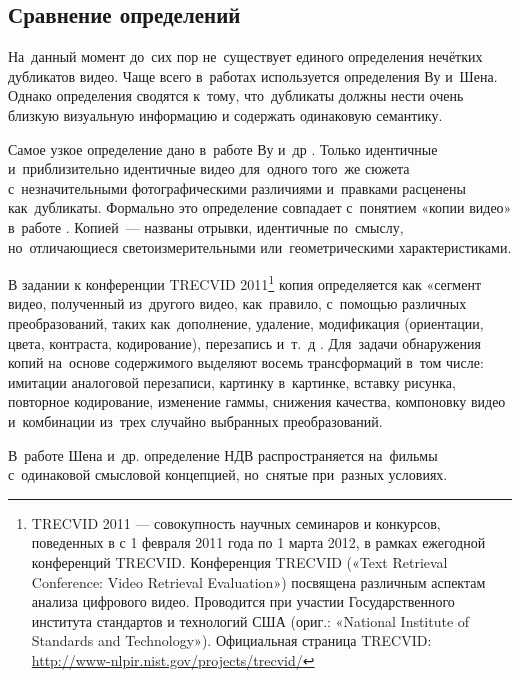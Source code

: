 \documentclass{.local/lib/classes/ndvr-super-article-standalone}
\begin{document}
    \pagebreak

    \subsection{Сравнение определений}

    На~данный момент до~сих пор не~существует единого
    определения нечётких дубликатов видео.
    Чаще всего в~работах используется определения Ву и~Шена.
    Однако определения сводятся к~тому, что~дубликаты 
    должны нести очень близкую визуальную информацию
    и содержать одинаковую семантику.

    Самое узкое определение дано в~работе Ву и~др \cite{Wu:2007a}.
    Только идентичные и~приблизительно идентичные видео
    для~одного того~же сюжета с~незначительными фотографическими различиями
    и~правками расценены как~дубликаты.
    Формально это определение совпадает
    с~понятием «копии видео» в~работе \cite{Law-To:2007}.
    Копией~— названы отрывки, идентичные по~смыслу,
    но~отличающиеся светоизмерительными 
    или~геометрическими характеристиками.

    В задании к конференции TRECVID 2011\footnote{
        TRECVID 2011 — совокупность научных семинаров и конкурсов,
        поведенных в с 1 февраля 2011 года по 1 марта 2012,
        в рамках ежегодной конференций TRECVID.
        Конференция TRECVID 
        («Text Retrieval Conference: 
        Video Retrieval Evaluation») 
        посвящена различным аспектам анализа цифрового видео.
        Проводится при участии Государственного института 
        стандартов и технологий США 
        (ориг.: «National Institute of Standards and Technology»).
        Официальная страница TRECVID:
            \href{http://www-nlpir.nist.gov/projects/trecvid/}%
                {http://www-nlpir.nist.gov/projects/trecvid/}
    } копия определяется как
    «сегмент видео, полученный из~другого видео,
    как~правило, с~помощью различных преобразований,
    таких как~дополнение, удаление, модификация
    (ориентации, цвета, контраста, кодирование),
    перезапись и~т.~д \cite{Over:2011} .
    Для~задачи обнаружения копий на~основе 
    содержимого выделяют восемь
    трансформаций в~том числе:
        имитации аналоговой перезаписи,
        картинку в~картинке,
        вставку рисунка,
        повторное кодирование,
        изменение гаммы,
        снижения качества,
        компоновку видео
    и~комбинации из~трех случайно выбранных преобразований.

    В~работе Шена и~др. \cite{Shen:2007} 
    определение НДВ распространяется
    на~фильмы с~одинаковой смысловой концепцией, 
    но~снятые при~разных условиях.
\end{document}
